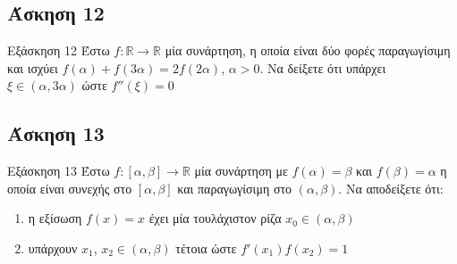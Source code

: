 \documentclass[greek]{beamer}
\begin{document}
\subsection{Άσκηση 12}
\begin{frame}[label=Άσκηση12]{Εξάσκηση 12}
  Έστω $f:\mathbb{R}\to\mathbb{R}$ μία συνάρτηση, η οποία είναι δύο φορές παραγωγίσιμη και ισχύει $f(α)+f(3α)=2f(2α)$, $α>0$. Να δείξετε ότι υπάρχει $ξ\in (α,3α)$ ώστε $f''(ξ)=0$

\end{frame}

\subsection{Άσκηση 13}
\begin{frame}[label=Άσκηση13]{Εξάσκηση 13}
  Έστω $f:[α,β]\to\mathbb{R}$ μία συνάρτηση με $f(α)=β$ και $f(β)=α$ η οποία είναι συνεχής στο $[α,β]$ και παραγωγίσιμη στο $(α,β)$. Να αποδείξετε ότι:
  \begin{enumerate}
    \item<1-> η εξίσωση $f(x)=x$ έχει μία τουλάχιστον ρίζα $x_0\in (α,β)$
    \item<2-> υπάρχουν $x_1$, $x_2\in (α,β)$ τέτοια ώστε $f'(x_1)f(x_2)=1$
  \end{enumerate}

\end{frame}
\end{document}
